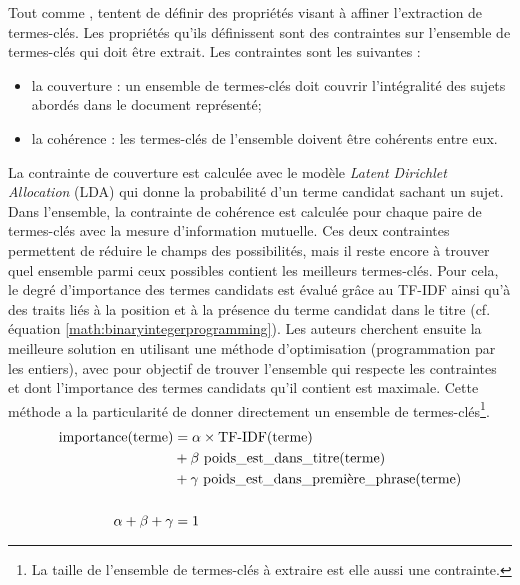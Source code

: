           Tout comme \citet{tomokiyo2003languagemodel},
          \citet{ding2011binaryintegerprogramming} tentent de définir des propriétés
          visant à affiner l'extraction de termes-clés. Les propriétés qu'ils
          définissent sont des contraintes sur l'ensemble de termes-clés qui doit
          être extrait. Les contraintes sont les suivantes :
          \begin{itemize}
            \item{la couverture : un ensemble de termes-clés doit couvrir
                  l'intégralité des sujets abordés dans le document
                  représenté;}
            \item{la cohérence : les termes-clés de l'ensemble doivent être
                  cohérents entre eux.}
          \end{itemize}
          La contrainte de couverture est calculée avec le modèle \textit{Latent
          Dirichlet Allocation} (LDA) \citep{blei2003lda} qui donne la probabilité
          d'un terme candidat sachant un sujet. Dans l'ensemble, la contrainte de
          cohérence est calculée pour chaque paire de termes-clés avec la mesure
          d'information mutuelle. Ces deux contraintes permettent de réduire le
          champs des possibilités, mais il reste encore à trouver quel ensemble
          parmi ceux possibles contient les meilleurs termes-clés. Pour cela, le
          degré d'importance des termes candidats est évalué grâce au TF-IDF ainsi
          qu'à des traits liés à la position et à la présence du terme candidat dans le titre
          (cf. équation \ref{math:binaryintegerprogramming}). Les auteurs cherchent
          ensuite la meilleure solution en utilisant une méthode d'optimisation
          (programmation par les entiers), avec pour objectif de trouver l'ensemble
          qui respecte les contraintes et dont l'importance des termes candidats
          qu'il contient est maximale. Cette méthode a la particularité de donner
          directement un ensemble de termes-clés\footnote{La taille de l'ensemble de
          termes-clés à extraire est elle aussi une contrainte.}.
          \begin{align}
            \text{importance}(\text{terme}) &= \alpha \times \text{TF-IDF}(\text{terme}) \notag\\
                              &+ \beta\ \text{poids\_est\_dans\_titre}(\text{terme}) \notag\\
                              &+ \gamma\ \text{poids\_est\_dans\_première\_phrase}(\text{terme}) \label{math:binaryintegerprogramming}\\
            \notag\\
            \alpha + \beta + \gamma &= 1 \notag
          \end{align}

